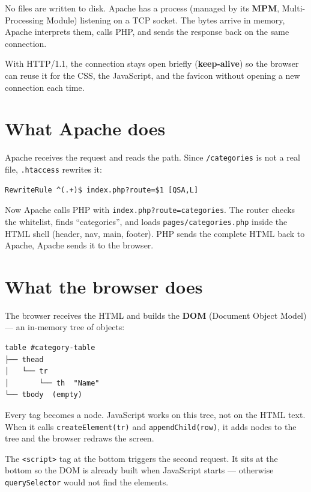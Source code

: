 \documentclass[11pt,a4paper,oneside]{book}
\begin{document}
No files are written to disk. Apache has a process (managed by
its \textbf{MPM}, Multi-Processing Module) listening on a TCP
socket. The bytes arrive in memory, Apache interprets them, calls
PHP, and sends the response back on the same connection.

With HTTP/1.1, the connection stays open briefly
(\textbf{keep-alive}) so the browser can reuse it for the CSS,
the JavaScript, and the favicon without opening a new connection
each time.

\hypertarget{what-apache-does}{%
\section{What Apache does}\label{what-apache-does}}

Apache receives the request and reads the path. Since
\texttt{/categories} is not a real file, \texttt{.htaccess}
rewrites it:

\begin{verbatim}
RewriteRule ^(.+)$ index.php?route=$1 [QSA,L]
\end{verbatim}

Now Apache calls PHP with \texttt{index.php?route=categories}.
The router checks the whitelist, finds ``categories'', and loads
\texttt{pages/categories.php} inside the HTML shell (header, nav,
main, footer). PHP sends the complete HTML back to Apache, Apache
sends it to the browser.

\hypertarget{what-the-browser-does}{%
\section{What the browser does}\label{what-the-browser-does}}

The browser receives the HTML and builds the \textbf{DOM}
(Document Object Model) --- an in-memory tree of objects:

\begin{verbatim}
table #category-table
├── thead
│   └── tr
│       └── th  "Name"
└── tbody  (empty)
\end{verbatim}

Every tag becomes a node. JavaScript works on this tree, not on
the HTML text. When it calls
\texttt{createElement(\textquotesingle{}tr\textquotesingle{})}
and \texttt{appendChild(row)}, it adds nodes to the tree and the
browser redraws the screen.

The \texttt{\textless{}script\textgreater{}} tag at the bottom
triggers the second request. It sits at the bottom so the DOM is
already built when JavaScript starts --- otherwise
\texttt{querySelector} would not find the elements.
\end{document}
